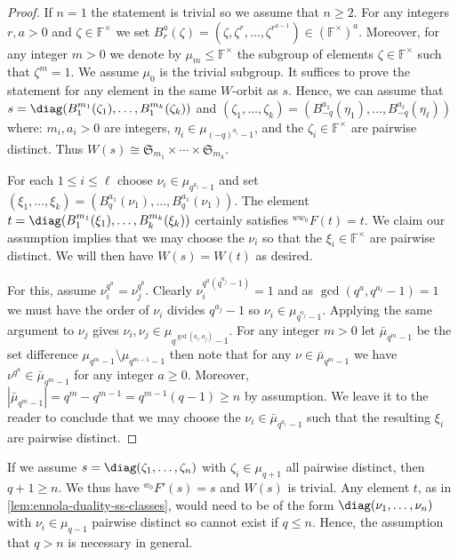 \documentclass[eqthmnum,nocolour,skinny]{jt-calcs}
\begin{document}
\begin{proof}
If $n=1$ the statement is trivial so we assume that $n \geqslant 2$. For any integers $r,a >0$ and $\zeta \in \mathbb{F}^{\times}$ we set $B_r^a(\zeta) = (\zeta,\zeta^r,\dots,\zeta^{r^{a-1}}) \in (\mathbb{F}^{\times})^a$. Moreover, for any integer $m > 0$ we denote by $\mu_m \leqslant \mathbb{F}^{\times}$ the subgroup of elements $\zeta \in \mathbb{F}^{\times}$ such that $\zeta^m = 1$. We assume $\mu_0$ is the trivial subgroup. It suffices to prove the statement for any element in the same $W$-orbit as $s$. Hence, we can assume that $s = \diag(B_1^{m_1}(\zeta_1),\dots,B_1^{m_k}(\zeta_k))$ and $(\zeta_1,\dots,\zeta_k) = (B_{-q}^{a_1}(\eta_1),\dots,B_{-q}^{a_{\ell}}(\eta_{\ell}))$ where: $m_i,a_i > 0$ are integers, $\eta_i \in \mu_{(-q)^{a_i}-1}$, and the $\zeta_i \in \mathbb{F}^{\times}$ are pairwise distinct. Thus $W(s) \cong \mathfrak{S}_{m_1}\times\cdots\times \mathfrak{S}_{m_k}$.

For each $1 \leqslant i \leqslant \ell$ choose $\nu_i \in \mu_{q^{a_i}-1}$ and set $(\xi_1,\dots,\xi_k) = (B_q^{a_1}(\nu_1),\dots,B_q^{a_1}(\nu_1))$. The element $t = \diag(B_1^{m_1}(\xi_1),\dots,B_k^{m_k}(\xi_k))$ certainly satisfies ${}^{ww_0}F(t)=t$. We claim our assumption implies that we may choose the $\nu_i$ so that the $\xi_i \in \mathbb{F}^{\times}$ are pairwise distinct. We will then have $W(s) = W(t)$ as desired.

For this, assume $\nu_i^{q^a} = \nu_j^{q^b}$. Clearly $\nu_i^{q^a(q^{a_j}-1)} = 1$ and as $\gcd(q^a,q^{a_i}-1) = 1$ we must have the order of $\nu_i$ divides $q^{a_j}-1$ so $\nu_i \in \mu_{q^{a_j}-1}$. Applying the same argument to $\nu_j$ gives $\nu_i,\nu_j \in \mu_{q^{\gcd(a_i,a_j)}-1}$. For any integer $m > 0$ let $\bar{\mu}_{q^m-1}$ be the set difference $\mu_{q^m-1} \setminus \mu_{q^{m-1}-1}$ then note that for any $\nu \in \bar{\mu}_{q^m-1}$ we have $\nu^{q^a} \in \bar{\mu}_{q^m-1}$ for any integer $a \geqslant 0$. Moreover, $|\bar{\mu}_{q^m-1}| = q^m-q^{m-1} = q^{m-1}(q-1) \geqslant n$ by assumption. We leave it to the reader to conclude that we may choose the $\nu_i \in \bar{\mu}_{q^{a_i}-1}$ such that the resulting $\xi_i$ are pairwise distinct.
\end{proof}

\begin{rem}
If we assume $s = \diag(\zeta_1,\dots,\zeta_n)$ with $\zeta_i \in \mu_{q+1}$ all pairwise distinct, then $q+1\geqslant n$. We thus have ${}^{w_0}F'(s) = s$ and $W(s)$ is trivial. Any element $t$, as in \cref{lem:ennola-duality-ss-classes}, would need to be of the form $\diag(\nu_1,\dots,\nu_n)$ with $\nu_i \in \mu_{q-1}$ pairwise distinct so cannot exist if $q \leqslant n$. Hence, the assumption that $q>n$ is necessary in general.
\end{rem}
\end{document}
